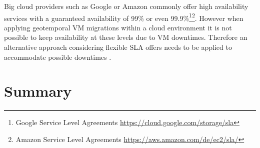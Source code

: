 Big cloud providers such as Google or Amazon commonly offer high availability services with a guaranteed availability of 99\% or even 99.9\%\footnote{Google Service Level Agreements \url{https://cloud.google.com/storage/sla}}\footnote{Amazon Service Level Agreements \url{https://aws.amazon.com/de/ec2/sla/}}. However when applying geotemporal VM migrations within a cloud environment it is not possible to keep availability at these levels due to VM downtimes. Therefore an alternative approach considering flexible SLA offers needs to be applied to accommodate possible downtimes \cite{luvcanin2014energy}. 













%
%
%
%




\section{Summary}



